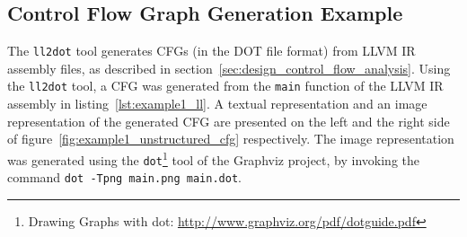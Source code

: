 
\subsection{Control Flow Graph Generation Example}
\label{app:control_flow_graph_generation_example}

The \texttt{ll2dot} tool generates CFGs (in the DOT file format) from LLVM IR assembly files, as described in section~\ref{sec:design_control_flow_analysis}. Using the \texttt{ll2dot} tool, a CFG was generated from the \texttt{main} function of the LLVM IR assembly in listing~\ref{lst:example1_ll}. A textual representation and an image representation of the generated CFG are presented on the left and the right side of figure~\ref{fig:example1_unstructured_cfg} respectively. The image representation was generated using the \texttt{dot}\footnote{Drawing Graphs with dot: \url{http://www.graphviz.org/pdf/dotguide.pdf}} tool of the Graphviz project, by invoking the command \texttt{dot -Tpng main.png main.dot}.

